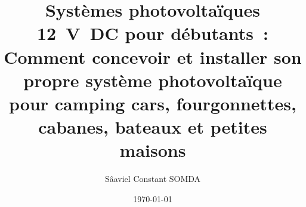 

	\title{Systèmes photovoltaïques 12~V~DC pour débutants~: Comment concevoir et installer son propre système photovoltaïque pour camping cars, fourgonnettes, cabanes, bateaux et petites maisons}
	\author{Sâaviel Constant SOMDA}
	\date{\today}
	\maketitle
	\setcounter{tocdepth}{3}
	\tableofcontents
	
	
	
	
	
	
	
	\nocite{*}
	\printbibliography[heading=bibintoc,title={Bibliographie}]


